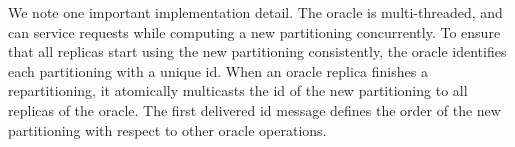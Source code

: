  We note one important implementation detail.  The oracle is
 multi-threaded, and can service requests while computing a new
 partitioning concurrently. To ensure that all replicas start using
 the new partitioning consistently, the oracle identifies each
 partitioning with a unique id.  When an oracle replica finishes a
 repartitioning, it atomically multicasts the id of the new
 partitioning to all replicas of the oracle.  The first delivered id
 message defines the order of the new partitioning with respect to
 other oracle operations.







